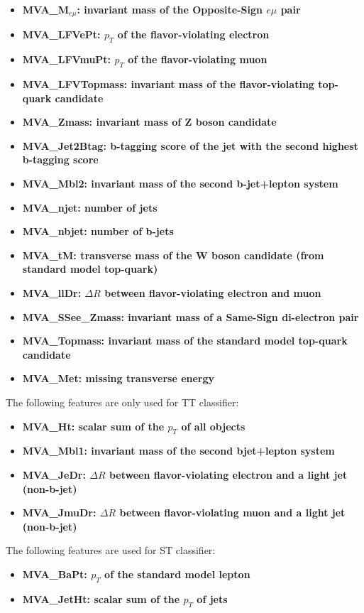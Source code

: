 \begin{itemize}
\item \textbf{MVA\_M$_{e\mu}$: invariant mass of the Opposite-Sign $e\mu$ pair}
\item \textbf{MVA\_LFVePt: $p_T$ of the flavor-violating electron}
\item \textbf{MVA\_LFVmuPt: $p_T$ of the flavor-violating muon}
\item \textbf{MVA\_LFVTopmass: invariant mass of the flavor-violating top-quark candidate}
\item \textbf{MVA\_Zmass: invariant mass of Z boson candidate}
\item \textbf{MVA\_Jet2Btag: b-tagging score of the jet with the second highest b-tagging score}
\item \textbf{MVA\_Mbl2: invariant mass of the second b-jet+lepton system}
\item \textbf{MVA\_njet: number of jets}
\item \textbf{MVA\_nbjet: number of b-jets}
\item \textbf{MVA\_tM: transverse mass of the W boson candidate (from standard model top-quark)}
\item \textbf{MVA\_llDr: $\Delta R$ between flavor-violating electron and muon}
\item \textbf{MVA\_SSee\_Zmass: invariant mass of a Same-Sign di-electron pair}
\item \textbf{MVA\_Topmass: invariant mass of the standard model top-quark candidate}
\item \textbf{MVA\_Met: missing transverse energy}
\end{itemize}

The following features are only used for TT classifier:

\begin{itemize}
\item \textbf{MVA\_Ht: scalar sum of the $p_T$ of all objects}
\item \textbf{MVA\_Mbl1: invariant mass of the second bjet+lepton system}
\item \textbf{MVA\_JeDr: $\Delta R$ between flavor-violating electron and a light jet (non-b-jet)}
\item \textbf{MVA\_JmuDr: $\Delta R$ between flavor-violating muon and a light jet (non-b-jet)}
\end{itemize}

The following features are used for ST classifier:

\begin{itemize}
\item \textbf{MVA\_BaPt: $p_T$ of the standard model lepton}
\item \textbf{MVA\_JetHt: scalar sum of the $p_T$ of jets}
\end{itemize}

